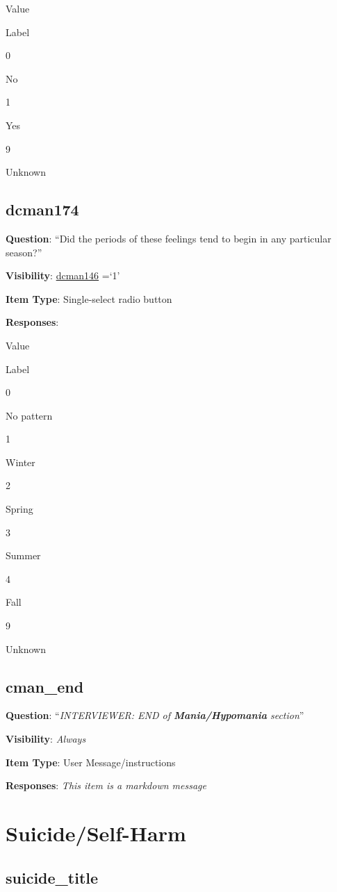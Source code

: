\documentclass[]{book}
\begin{document}
Value

Label

0

No

1

Yes

9

Unknown

\hypertarget{dcman174}{%
\section{dcman174}\label{dcman174}}

\textbf{Question}: ``Did the periods of these feelings tend to begin in any particular season?''

\textbf{Visibility}: \protect\hyperlink{dcman146}{dcman146} =`1'

\textbf{Item Type}: Single-select radio button

\textbf{Responses}:

Value

Label

0

No pattern

1

Winter

2

Spring

3

Summer

4

Fall

9

Unknown

\hypertarget{cman_end}{%
\section{cman\_end}\label{cman_end}}

\textbf{Question}: ``\emph{INTERVIEWER: END of \textbf{Mania/Hypomania} section}''

\textbf{Visibility}: \emph{Always}

\textbf{Item Type}: User Message/instructions

\textbf{Responses}: \emph{This item is a markdown message}

\hypertarget{suicide_section}{%
\chapter{Suicide/Self-Harm}\label{suicide_section}}

\hypertarget{suicide_title}{%
\section{suicide\_title}\label{suicide_title}}
\end{document}
